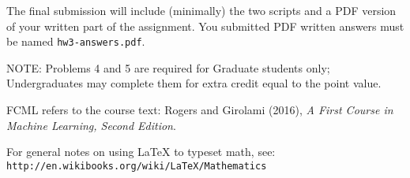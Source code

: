 \documentclass[10pt]{article}
\newcommand{\latex}{\LaTeX\xspace}
\begin{document}
The final submission will include (minimally) the two scripts and a PDF version of your written part of the assignment. You submitted PDF written answers must be named {\tt hw3-answers.pdf}.

NOTE: Problems 4 and 5 are required for Graduate students only; Undergraduates may complete them for extra credit equal to the point value.

FCML refers to the course text: Rogers and Girolami (2016), {\em A First Course in Machine Learning, Second Edition}.  

For general notes on using \latex to typeset math, see: {\tt http://en.wikibooks.org/wiki/LaTeX/Mathematics}
\vspace{.5cm}

\end{document}
